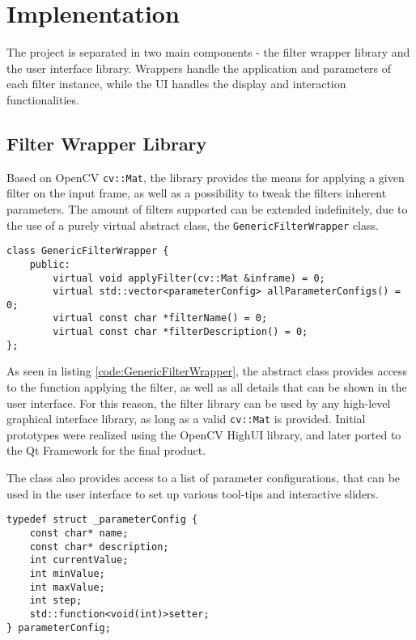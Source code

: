 \chapter{Implenentation}

The project is separated in two main components - the filter wrapper library and the user interface library.
Wrappers handle the application and parameters of each filter instance, while the UI handles the display
and interaction functionalities.

\section{Filter Wrapper Library}

Based on OpenCV \verb|cv::Mat|, the library provides the means for applying a given filter on the input frame,
as well as a possibility to tweak the filters inherent parameters. The amount of filters supported can be
extended indefinitely, due to the use of a purely virtual abstract class, the \verb|GenericFilterWrapper| class.

\begin{minipage}{\textwidth}
\begin{lstlisting}[caption={Generic wrapper class definition}, label=code:GenericFilterWrapper]
class GenericFilterWrapper {
    public:
        virtual void applyFilter(cv::Mat &inframe) = 0;
        virtual std::vector<parameterConfig> allParameterConfigs() = 0;
        virtual const char *filterName() = 0;
        virtual const char *filterDescription() = 0;
};
\end{lstlisting}
\end{minipage}

As seen in listing \ref{code:GenericFilterWrapper}, the abstract class provides access to the function 
applying the filter, as well as all details that can be shown in the user interface. For this reason, 
the filter library can be used by any high-level graphical interface library, as long as a valid 
\verb|cv::Mat| is provided. Initial prototypes were realized using the OpenCV HighUI library, and later 
ported to the Qt Framework for the final product.

The class also provides access to a list of parameter configurations, that can be used in the user
interface to set up various tool-tips and interactive sliders.

\begin{minipage}{\textwidth}
\begin{lstlisting}[caption={Parameter configuration structure}, label=code:parameterConfig]
typedef struct _parameterConfig {
    const char* name;
    const char* description;
    int currentValue;
    int minValue;
    int maxValue;
    int step;
    std::function<void(int)>setter;
} parameterConfig;
\end{lstlisting}
\end{minipage}

